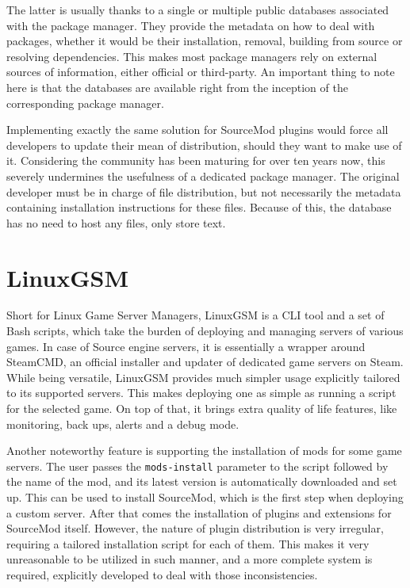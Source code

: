 The latter is usually thanks to a single or multiple public databases associated with the package manager.
They provide the metadata on how to deal with packages, whether it would be their installation, removal, building from source or resolving dependencies.
This makes most package managers rely on external sources of information, either official or third-party.
An important thing to note here is that the databases are available right from the inception of the corresponding package manager.

Implementing exactly the same solution for SourceMod plugins would force all developers to update their mean of distribution, should they want to make use of it.
Considering the community has been maturing for over ten years now, this severely undermines the usefulness of a dedicated package manager.
The original developer must be in charge of file distribution, but not necessarily the metadata containing installation instructions for these files.
Because of this, the database has no need to host any files, only store text.

\section{LinuxGSM}

Short for Linux Game Server Managers, LinuxGSM \cite{linux-gsm} is a CLI tool and a set of Bash scripts, which take the burden of deploying and managing servers of various games.
In case of Source engine servers, it is essentially a wrapper around SteamCMD, an official installer and updater of dedicated game servers on Steam.
While being versatile, LinuxGSM provides much simpler usage explicitly tailored to its supported servers.
This makes deploying one as simple as running a script for the selected game.
On top of that, it brings extra quality of life features, like monitoring, back ups, alerts and a debug mode.

Another noteworthy feature is supporting the installation of mods for some game servers.
The user passes the \verb|mods-install| parameter to the script followed by the name of the mod, and its latest version is automatically downloaded and set up.
This can be used to install SourceMod, which is the first step when deploying a custom server.
After that comes the installation of plugins and extensions for SourceMod itself.
However, the nature of plugin distribution is very irregular, requiring a tailored installation script for each of them.
This makes it very unreasonable to be utilized in such manner, and a more complete system is required, explicitly developed to deal with those inconsistencies.

